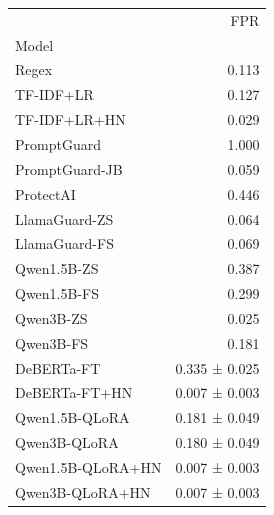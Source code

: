 \begin{tabular}{lr}
\toprule
 & FPR \\
Model &  \\
\midrule
Regex & 0.113 \\
TF-IDF+LR & 0.127 \\
TF-IDF+LR+HN & 0.029 \\
PromptGuard & 1.000 \\
PromptGuard-JB & 0.059 \\
ProtectAI & 0.446 \\
LlamaGuard-ZS & 0.064 \\
LlamaGuard-FS & 0.069 \\
Qwen1.5B-ZS & 0.387 \\
Qwen1.5B-FS & 0.299 \\
Qwen3B-ZS & 0.025 \\
Qwen3B-FS & 0.181 \\
DeBERTa-FT & 0.335 ± 0.025 \\
DeBERTa-FT+HN & 0.007 ± 0.003 \\
Qwen1.5B-QLoRA & 0.181 ± 0.049 \\
Qwen3B-QLoRA & 0.180 ± 0.049 \\
Qwen1.5B-QLoRA+HN & 0.007 ± 0.003 \\
Qwen3B-QLoRA+HN & 0.007 ± 0.003 \\
\bottomrule
\end{tabular}
